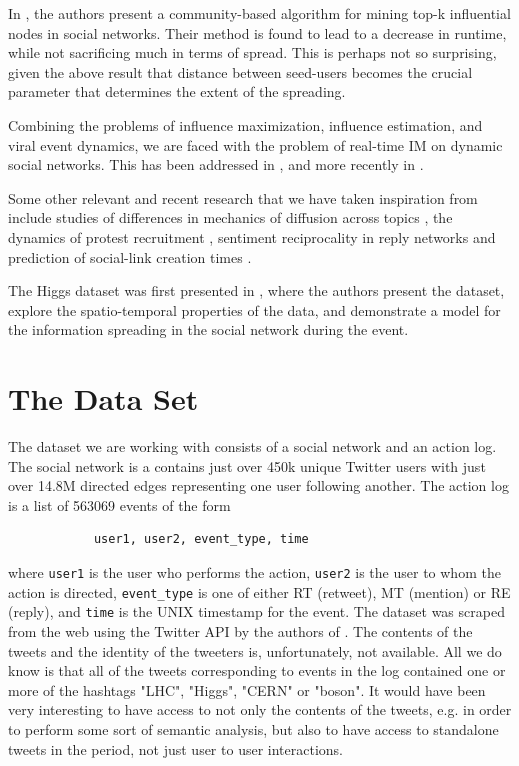 \documentclass[sigconf]{acmart}
\begin{document}
In \cite{wang2010community}, the authors present a community-based algorithm for mining top-k influential nodes in social networks. Their method is found to lead to a decrease in runtime, while not sacrificing much in terms of spread. This is perhaps not so surprising, given the above result that distance between seed-users becomes the crucial parameter that determines the extent of the spreading. 

Combining the problems of influence maximization, influence estimation, and viral event dynamics, we are faced with the problem of real-time IM on dynamic social networks. This has been addressed in \cite{rodriguez2012influence}, and more recently in \cite{wang2017real}.

Some other relevant and recent research that we have taken inspiration from include studies of differences in mechanics of diffusion across topics \cite{romero2011differences}, the dynamics of protest recruitment \cite{gonzalez2011dynamics}, sentiment reciprocality in reply networks \cite{bliss2012twitter} and prediction of social-link creation times \cite{meeder2011we}.

The Higgs dataset was first presented in \cite{de2013anatomy}, where the authors present the dataset, explore the spatio-temporal properties of the data, and demonstrate a model for the information spreading in the social network during the event.

\section{The Data Set}

The dataset we are working with consists of a social network and an action log. The social network is a contains just over 450k unique Twitter users with just over 14.8M directed edges representing one user following another. The action log is a list of 563069 events of the form 

\begin{center}
\begin{verbatim}
            user1, user2, event_type, time
\end{verbatim}
\end{center}

where \verb+user1+ is the user who performs the action, \verb+user2+ is the user to whom the action is directed, \verb+event_type+ is one of either RT (retweet), MT (mention) or RE (reply), and \verb+time+ is the UNIX timestamp for the event. The dataset was scraped from the web using the Twitter API by the authors of \cite{de2013anatomy}. The contents of the tweets and the identity of the tweeters is, unfortunately, not available. All we do know is that all of the tweets corresponding to events in the log contained one or more of the hashtags "LHC", "Higgs", "CERN" or "boson". It would have been very interesting to have access to not only the contents of the tweets, e.g. in order to perform some sort of semantic analysis, but also to have access to standalone tweets in the period, not just user to user interactions. 
\end{document}
